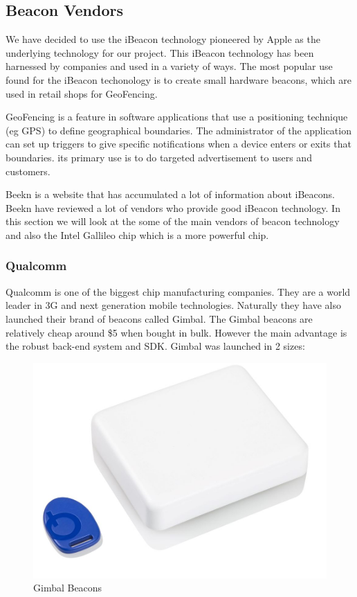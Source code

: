 


\subsection{Beacon Vendors}

We have decided to use the iBeacon technology pioneered by Apple as
the underlying technology for our project. This iBeacon technology has been harnessed by companies and used in a variety of ways. The most popular use found for the iBeacon techonology is to create small hardware beacons, which are used in retail shops for GeoFencing. 

GeoFencing is a feature in software applications that use a positioning technique (eg GPS) to define geographical boundaries. The administrator of the application can set up triggers to give specific notifications when a device enters or exits that boundaries\cite{whatisgeofencing}. its primary use is to do targeted advertisement to users and customers.

Beekn\cite{beekn} is a website that has accumulated a lot of information about iBeacons. Beekn have reviewed a lot of vendors who provide good iBeacon technology. In this section we will look at the some of the main vendors of beacon technology and also the Intel Gallileo chip which is a more powerful chip.


\subsubsection{Qualcomm}

Qualcomm\cite{quallcomm} is one of the biggest chip manufacturing
companies. They are a world leader in 3G and next generation mobile
technologies. Naturally they have also launched their brand of beacons
called Gimbal\cite{gimbal}. The Gimbal beacons are relatively cheap
around \$5 when bought in bulk. However the main advantage is the
robust back-end system and SDK. Gimbal was launched in 2 sizes:

\begin{figure}[H]
\centering
\includegraphics[scale=0.2]{images/gimbal-beacon}

\protect\caption{Gimbal Beacons}
\end{figure}

